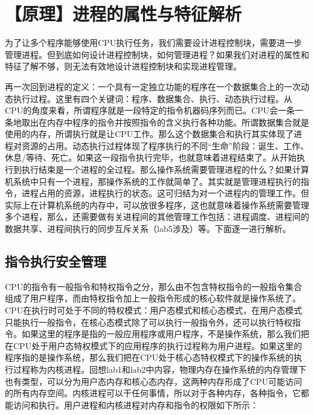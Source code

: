 \section{【原理】进程的属性与特征解析}\label{ux539fux7406ux8fdbux7a0bux7684ux5c5eux6027ux4e0eux7279ux5f81ux89e3ux6790}

为了让多个程序能够使用CPU执行任务，我们需要设计进程控制块，需要进一步管理进程。但到底如何设计进程控制块，如何管理进程？如果我们对进程的属性和特征了解不够，则无法有效地设计进程控制块和实现进程管理。

再一次回到进程的定义：一个具有一定独立功能的程序在一个数据集合上的一次动态执行过程。这里有四个关键词：程序、数据集合、执行、动态执行过程。从CPU的角度来看，所谓程序就是一段特定的指令机器码序列而已。CPU会一条一条地取出在内存中程序的指令并按照指令的含义执行各种功能。所谓数据集合就是使用的内存，所谓执行就是让CPU工作。那么这个数据集合和执行其实体现了进程对资源的占用。动态执行过程体现了程序执行的不同``生命''阶段：诞生、工作、休息/等待、死亡。如果这一段指令执行完毕，也就意味着进程结束了。从开始执行到执行结束是一个进程的全过程。那么操作系统需要管理进程的什么？如果计算机系统中只有一个进程，那操作系统的工作就简单了。其实就是管理进程执行的指令，进程占用的资源，进程执行的状态。这可归结为对一个进程内的管理工作。但实际上在计算机系统的内存中，可以放很多程序，这也就意味着操作系统需要管理多个进程，那么，还需要做有关进程间的其他管理工作包括：进程调度、进程间的数据共享、进程间执行的同步互斥关系（lab5涉及）等。下面逐一进行解析。

\subsection{指令执行安全管理}\label{ux6307ux4ee4ux6267ux884cux5b89ux5168ux7ba1ux7406}

CPU的指令有一般指令和特权指令之分，那么由不包含特权指令的一般指令集合组成了用户程序，而由特权指令加上一般指令形成的核心软件就是操作系统了。CPU在执行时可处于不同的特权模式：用户态模式和核心态模式，在用户态模式只能执行一般指令，在核心态模式除了可以执行一般指令外，还可以执行特权指令。如果这里的程序是指的一般应用程序或用户程序，不是操作系统，那么我们把在CPU处于用户态特权模式下的应用程序的执行过程称为用户进程。如果这里的程序指的是操作系统，那么我们把在CPU处于核心态特权模式下的操作系统的执行过程称为内核进程。回想lab1和lab2中内容，物理内存在操作系统的内存管理下也有类型，可以分为用户态内存和核心态内存，这两种内存形成了CPU可能访问的所有内存空间。内核进程可以干任何事情，所以对于各种内存，各种指令，它都能访问和执行。用户进程和内核进程对内存和指令的权限如下所示：

